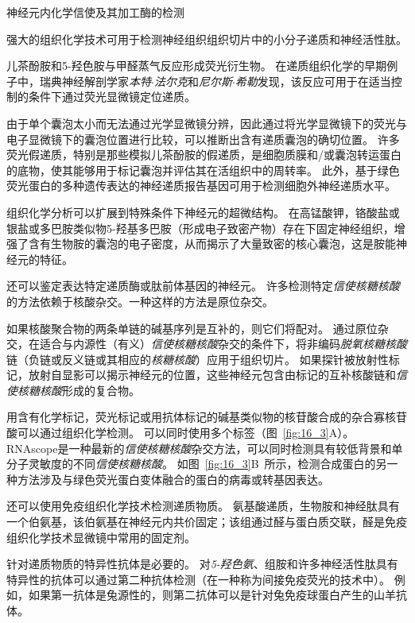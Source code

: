 \begin{proposition}[神经解剖学导航术语] \label{box:16_2}
	
	\quad \quad 神经元内化学信使及其加工酶的检测
	
	\quad \quad 强大的组织化学技术可用于检测神经组织组织切片中的小分子递质和神经活性肽。
	
	\quad \quad 儿茶酚胺和5-羟色胺与甲醛蒸气反应形成荧光衍生物。
	在递质组织化学的早期例子中，瑞典神经解剖学家\textit{本特$\cdot$法尔克}和\textit{尼尔斯$\cdot$希勒}发现，该反应可用于在适当控制的条件下通过荧光显微镜定位递质。
	
	\quad \quad 由于单个囊泡太小而无法通过光学显微镜分辨，因此通过将光学显微镜下的荧光与电子显微镜下的囊泡位置进行比较，可以推断出含有递质囊泡的确切位置。
	许多荧光假递质，特别是那些模拟儿茶酚胺的假递质，是细胞质膜和/或囊泡转运蛋白的底物，使其能够用于标记囊泡并评估其在活组织中的周转率。
	此外，基于绿色荧光蛋白的多种遗传表达的神经递质报告基因可用于检测细胞外神经递质水平。
	
	\quad \quad 组织化学分析可以扩展到特殊条件下神经元的超微结构。
	在高锰酸钾，铬酸盐或银盐或多巴胺类似物5-羟基多巴胺（形成电子致密产物）存在下固定神经组织，增强了含有生物胺的囊泡的电子密度，从而揭示了大量致密的核心囊泡，这是胺能神经元的特征。
	
	\quad \quad 还可以鉴定表达特定递质酶或肽前体基因的神经元。
	许多检测特定\textit{信使核糖核酸}的方法依赖于核酸杂交。一种这样的方法是原位杂交。
	
	\quad \quad 如果核酸聚合物的两条单链的碱基序列是互补的，则它们将配对。
	通过原位杂交，在适合与内源性（有义）\textit{信使核糖核酸}杂交的条件下，将非编码\textit{脱氧核糖核酸}链（负链或反义链或其相应的\textit{核糖核酸}）应用于组织切片。
	如果探针被放射性标记，放射自显影可以揭示神经元的位置，这些神经元包含由标记的互补核酸链和\textit{信使核糖核酸}形成的复合物。
	
	\quad \quad 用含有化学标记，荧光标记或用抗体标记的碱基类似物的核苷酸合成的杂合寡核苷酸可以通过组织化学检测。
	可以同时使用多个标签（图~\ref{fig:16_3}A）。
	RNAscope是一种最新的\textit{信使核糖核酸}杂交方法，可以同时检测具有较低背景和单分子灵敏度的不同\textit{信使核糖核酸}。
	如图~\ref{fig:16_3}B~所示，检测合成蛋白的另一种方法涉及与绿色荧光蛋白变体融合的蛋白的病毒或转基因表达。
	
	\quad \quad 还可以使用免疫组织化学技术检测递质物质。
	氨基酸递质，生物胺和神经肽具有一个伯氨基，该伯氨基在神经元内共价固定；该组通过醛与蛋白质交联，醛是免疫组织化学技术显微镜中常用的固定剂。
	
	\quad \quad 针对递质物质的特异性抗体是必要的。
	对\textit{5-羟色氨}、组胺和许多神经活性肽具有特异性的抗体可以通过第二种抗体检测（在一种称为间接免疫荧光的技术中）。
	例如，如果第一抗体是兔源性的，则第二抗体可以是针对兔免疫球蛋白产生的山羊抗体。
	

\end{proposition}
